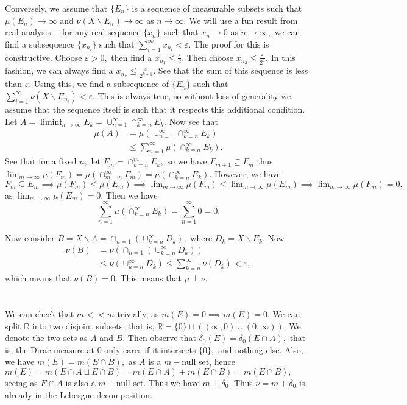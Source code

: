 \documentclass{article}
\begin{document}
Conversely, we assume that $\{E_n\}$ is a sequence of measurable subsets such that $\mu(E_n)\to \infty$ and $\nu(X \backslash E_n) \to \infty$ as $n \to 
\infty.$ We will use a fun result from real analysis--- for any real sequence $\{x_n\}$ such that $x_n \rightarrow 0$ as $n \to \infty,$ we can find a 
subsequence $\{x_{n_i}\}$ such that $\sum_{i=1}^{\infty}x_{n_i}< \varepsilon.$ The proof for this is constructive. Choose $\varepsilon>0,$ then find a 
$x_{n_1} \leq \frac{\varepsilon}{2}.$ Then choose $x_{n_2} 
\leq \frac{\varepsilon}{2^2}.$ In this fashion, we can always find a $x_{n_k} \leq \frac{\varepsilon}{2^{k+1}}.$ See that the sum of this sequence is less 
than $\varepsilon$. Using this, we find a subsequence of $\{E_n\}$ such that $\sum_{i=1}^{\infty} \nu(X\backslash E_{n_i})<\varepsilon.$ This is always 
true, so without loss 
of generality we assume that the sequence itself is such that it respects this additional condition. Let $A= \liminf_{n \to \infty} E_k= 
\cup_{n=1}^{\infty}\cap_{k=n}^{\infty}E_k.$ Now see that 
\begin{align*}
	\mu(A) &= \mu\left(\cup_{n=1}^{\infty}\cap_{k=n}^{\infty}E_k\right)\\
	&\leq \sum_{n=1}^{\infty} \mu \left(\cap_{k=n}^{\infty}E_k\right).
\end{align*} 
See that for a fixed $n,$ let $F_m=\cap_{k=n}^m E_k,$ so we have $F_{m+1} \subseteq F_m$ thus $\lim_{m \to \infty} 
\mu(F_m)=\mu\left(\cap_{m=n}^{\infty}F_m\right)=\mu\left(\cap_{k=n}^{\infty}E_k \right).$ However, we have $F_m \subseteq E_m \implies \mu(F_m) \leq 
\mu(E_m) \implies \lim_{m \to \infty} \mu(F_m) \leq \lim_{m \to \infty} \mu(E_m) \implies \lim_{m \to \infty} \mu(F_m)=0,$ as $\lim_{m \to \infty} 
\mu(E_m)=0.$ Then we have $$\sum_{n=1}^{\infty} \mu \left(\cap_{k=n}^{\infty}E_k\right)= \sum_{n=1}^{\infty}0=0.$$

Now consider $B=X\backslash A= \cap_{n=1}\left(\cup_{k=n}^{\infty}D_k\right),$ where $D_k=X \backslash E_k.$ Now \begin{align*}
	\nu(B)&= \nu\left(\cap_{n=1}\left(\cup_{k=n}^{\infty}D_k\right)\right)\\
	 &\leq \nu \left(\cup_{k=n}^{\infty}D_k\right) \leq \sum_{k=n}^{\infty} \nu(D_k)<\varepsilon,
\end{align*}  
which means that $\nu(B)=0.$ This means that $\mu \perp \nu.$
\section{} %
We can check that $m << m$ trivially, as $m(E)=0 \implies m(E)=0.$ We can split $\mathbb{R}$ into two disjoint subsets, that is, $\mathbb{R}= \{0\} \sqcup 
((\infty,0)\cup (0,\infty)).$ We denote the two sets as $A$ and $B.$ Then observe that $\delta_0(E)= \delta_0(E \cap A),$ that is, the Dirac measure at $0$ 
only cares if it intersects $\{0\},$ and nothing else. Also, we have $m(E)=m(E \cap B),$ as $A$ is a $m-$null set, hence $m(E)=m(E\cap A \sqcup E \cap 
B)=m(E \cap A)+ m(E \cap B)=m(E \cap B),$ seeing as $E \cap A$ is also a $m-$null set. Thus we have $m \perp \delta_0.$ Thus $\nu=m+\delta_0$ is already in 
the Lebesgue decomposition. 
\end{document}
